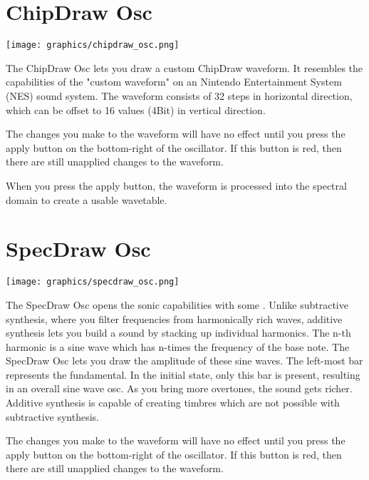 \section{ChipDraw Osc}
\label{chipdraw}
\begin{center}
    \texttt{[image: graphics/chipdraw\_osc.png]}
\end{center}
The ChipDraw Osc lets you draw a custom ChipDraw waveform. It resembles the capabilities of the "custom waveform" on an Nintendo Entertainment System (NES) sound system. The waveform consists of 32 steps in horizontal direction, which can be offset to 16 values (4Bit) in vertical direction.

\begin{tcolorbox}[colback=yellow!10!white,
        colframe=white!20!black,
        center,
        valign=top,
        halign=left,
        center title,
        width=\textwidth]

    The changes you make to the waveform will have no effect until you press the apply button on the bottom-right of the oscillator. If this button is red, then there are still unapplied changes to the waveform.
\end{tcolorbox}

When you press the apply button, the waveform is processed into the spectral domain to create a usable wavetable.

\section{SpecDraw Osc}
\begin{center}
    \texttt{[image: graphics/specdraw\_osc.png]}
\end{center}
The SpecDraw Osc opens the sonic capabilities with some . Unlike subtractive synthesis, where you filter frequencies from harmonically rich waves, additive synthesis lets you build a sound by stacking up individual harmonics. The n-th harmonic is a sine wave which has n-times the frequency of the base note. The SpecDraw Osc lets you draw the amplitude of these sine waves. The left-most bar represents the fundamental. In the initial state, only this bar is present, resulting in an overall sine wave osc. As you bring more overtones, the sound gets richer. Additive synthesis is capable of creating timbres which are not possible with subtractive synthesis.

\begin{tcolorbox}[colback=yellow!10!white,
        colframe=white!20!black,
        center,
        valign=top,
        halign=left,
        center title,
        width=\textwidth]

    The changes you make to the waveform will have no effect until you press the apply button on the bottom-right of the oscillator. If this button is red, then there are still unapplied changes to the waveform.
\end{tcolorbox}

